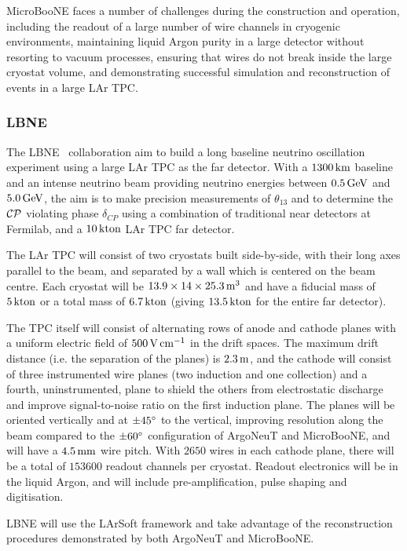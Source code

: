 MicroBooNE faces a number of challenges during the construction and operation, including the readout of a large number of wire channels in cryogenic environments, maintaining liquid Argon purity in a large detector without resorting to vacuum processes, ensuring that wires do not break inside the large cryostat volume, and demonstrating successful simulation and reconstruction of events in a large \acs{LAr TPC}.

\subsubsection{LBNE}
The LBNE~\citep{LBNE} collaboration aim to build a long baseline neutrino oscillation experiment using a large \acs{LAr TPC} as the far detector. With a $1300\km$ baseline and an intense neutrino beam providing neutrino energies between $0.5\GeV$ and $5.0\GeV$, the aim is to make precision measurements of $\theta_{13}$ and to determine the $\Charge\Parity$ violating phase $\delta_{CP}$ using a combination of traditional near detectors at Fermilab, and a $10\kton$ \acs{LAr TPC} far detector.

The \acs{LAr TPC} will consist of two cryostats built side-by-side, with their long axes parallel to the beam, and separated by a wall which is centered on the beam centre. Each cryostat will be $13.9\times 14\times 25.3\metre^3$ and have a fiducial mass of $5\kton$ or a total mass of $6.7\kton$ (giving $13.5\kton$ for the entire far detector).

The TPC itself will consist of alternating rows of anode and cathode planes with a uniform electric field of $500\volt\cm^{-1}$ in the drift spaces. The maximum drift distance (i.e. the separation of the planes) is $2.3\metre$, and the cathode will consist of three instrumented wire planes (two induction and one collection) and a fourth, uninstrumented, plane to shield the others from electrostatic discharge and improve signal-to-noise ratio on the first induction plane. The planes will be oriented vertically and at $\pm45\degree$ to the vertical, improving resolution along the beam compared to the $\pm60\degree$ configuration of ArgoNeuT and MicroBooNE, and will have a $4.5\mm$ wire pitch. With $2650$ wires in each cathode plane, there will be a total of $153600$ readout channels per cryostat. Readout electronics will be in the liquid Argon, and will include pre-amplification, pulse shaping and digitisation.

LBNE will use the LArSoft framework and take advantage of the reconstruction procedures demonstrated by both ArgoNeuT and MicroBooNE.

